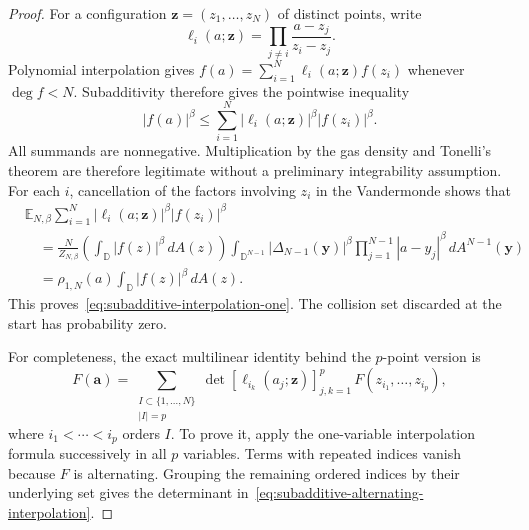 \documentclass[11pt,a4paper]{article}
\numberwithin{equation}{section}
\theoremstyle{definition}
\theoremstyle{remark}
\newcommand{\D}{\mathbb D}
\begin{document}
\begin{proof}
For a configuration $\mathbf z=(z_1,\ldots,z_N)$ of distinct points,
write
\[
 \ell_i(a;\mathbf z)=
 \prod_{j\ne i}\frac{a-z_j}{z_i-z_j}.
\]
Polynomial interpolation gives
$f(a)=\sum_{i=1}^N\ell_i(a;\mathbf z)f(z_i)$ whenever
$\deg f<N$. Subadditivity therefore gives the pointwise inequality
\[
 |f(a)|^\beta\le
 \sum_{i=1}^N |\ell_i(a;\mathbf z)|^\beta|f(z_i)|^\beta.
\]
All summands are nonnegative. Multiplication by the gas density and
Tonelli's theorem are therefore legitimate without a preliminary
integrability assumption. For each $i$, cancellation of the factors
involving $z_i$ in the Vandermonde shows that
\begin{align*}
 &\mathbb E_{N,\beta}\sum_{i=1}^N
       |\ell_i(a;\mathbf z)|^\beta|f(z_i)|^\beta\\
 &\quad=\frac{N}{Z_{N,\beta}}
 \left(\int_\D|f(z)|^\beta\,dA(z)\right)
 \int_{\D^{N-1}}|\Delta_{N-1}(\mathbf y)|^\beta
                  \prod_{j=1}^{N-1}|a-y_j|^\beta\,dA^{N-1}(\mathbf y)\\
 &\quad=\rho_{1,N}(a)\int_\D|f(z)|^\beta\,dA(z).
\end{align*}
This proves~\eqref{eq:subadditive-interpolation-one}. The collision
set discarded at the start has probability zero.

For completeness, the exact multilinear identity behind the
$p$-point version is
\begin{equation}
 F(\mathbf a)=
 \sum_{\substack{I\subset\{1,\ldots,N\}\\|I|=p}}
 \det[\ell_{i_k}(a_j;\mathbf z)]_{j,k=1}^p\,
 F(z_{i_1},\ldots,z_{i_p}),
 \label{eq:subadditive-alternating-interpolation}
\end{equation}
where $i_1<\cdots<i_p$ orders $I$. To prove it, apply the
one-variable interpolation formula successively in all $p$ variables.
Terms with repeated indices vanish because $F$ is alternating.
Grouping the remaining ordered indices by their underlying set gives
the determinant in~\eqref{eq:subadditive-alternating-interpolation}.


\end{proof}
\end{document}
